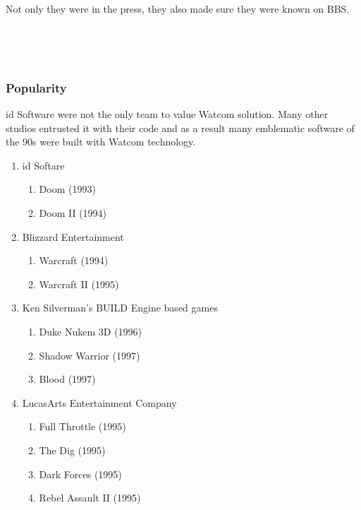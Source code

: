\vspace{-4mm}
Not only they were in the press, they also made sure they were known on BBS.\\
\par
{}\\
\par
{}\\


\subsubsection{Popularity}
id Software were not the only team to value Watcom solution. Many other studios entrusted it with their code and as a result many emblematic software of the 90s were built with Watcom technology.\\
\begin{enumerate}
\item id Softare 
       \begin{enumerate}
       \item Doom (1993)
       \item Doom II (1994)
       \end{enumerate} 
\item Blizzard Entertainment 
       \begin{enumerate}
       \item Warcraft (1994)
       \item Warcraft II (1995)
       \end{enumerate}
\item Ken Silverman's BUILD Engine based games
      \begin{enumerate}
       \item Duke Nukem 3D (1996)
       \item Shadow Warrior (1997)
       \item Blood (1997)
       \end{enumerate}
\item LucasArts Entertainment Company
      \begin{enumerate}
       \item Full Throttle (1995)
       \item The Dig (1995)
       \item Dark Forces  (1995)
       \item Rebel Assault II  (1995)    
      \end{enumerate}
\end{enumerate}
\par


